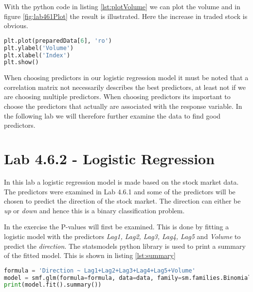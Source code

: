 \FloatBarrier

With the python code in listing \ref{lst:plotVolume} we can plot the volume and in figure \ref{fig:lab461Plot} the result is illustrated. Here the increase in traded stock is obvious.
\begin{lstlisting}[language=Python, label=lst:plotVolume, caption=Plot Volume]
plt.plot(preparedData[6], 'ro')
plt.ylabel('Volume')
plt.xlabel('Index')
plt.show()
\end{lstlisting}


When choosing predictors in our logistic regression model it must be noted that a correlation matrix not necessarily describes the best predictors, at least not if we are choosing multiple predictors. When choosing predictors its important to choose the predictors that actually are associated with the response variable. In the following lab we will therefore further examine the data to find good predictors.

\section{Lab 4.6.2 - Logistic Regression}
\label{sec:lab462}
In this lab a logistic regression model is made based on the stock market data. The predictors were examined in Lab 4.6.1 and some of the predictors will be chosen to predict the direction of the stock market. The direction can either be \emph{up} or \emph{down} and hence this is a binary classification problem.

In the exercise the P-values will first be examined. This is done by fitting a logistic model with the predictors \emph{Lag1, Lag2, Lag3, Lag4, Lag5} and \emph{Volume} to predict the \emph{direction}. The statsmodels python library is used to print a summary of the fitted model. This is shown in listing \ref{lst:summary}
\begin{lstlisting}[language=Python, label=lst:summary, caption=Print summary]
formula = 'Direction ~ Lag1+Lag2+Lag3+Lag4+Lag5+Volume'
model = smf.glm(formula=formula, data=data, family=sm.families.Binomial())
print(model.fit().summary())
\end{lstlisting}

\FloatBarrier

